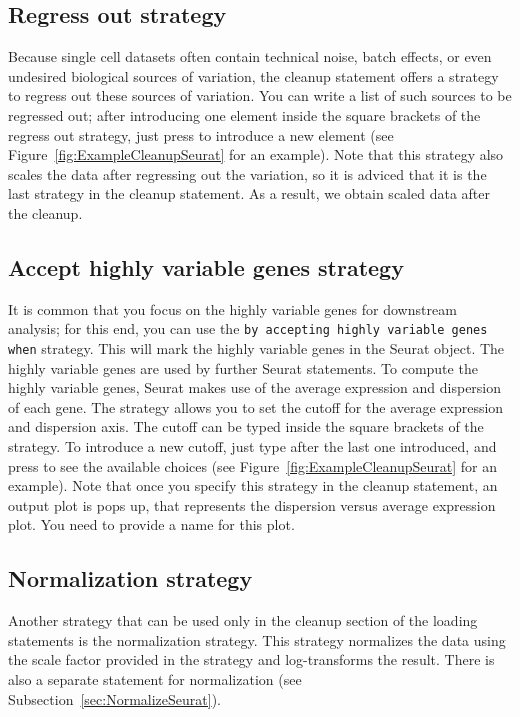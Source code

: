 \subsection{Regress out strategy}
Because single cell datasets often contain technical noise, batch effects, or even undesired
biological sources of variation, the cleanup statement offers a strategy to regress out
these sources of variation. You can write a list of such sources to be regressed out;
after introducing one element inside the square brackets of the regress out strategy, just
press \keys{\return} to introduce a new element (see Figure~\ref{fig:ExampleCleanupSeurat}
for an example). Note that this strategy also scales the data after regressing out the
variation, so it is adviced that it is the last strategy in the cleanup statement. As a result,
we obtain scaled data after the cleanup.

\subsection{Accept highly variable genes strategy}
It is common that you focus on the highly variable genes for downstream analysis; for this end,
you can use the \texttt{by accepting highly variable genes when} strategy. This will mark
the highly variable genes in the Seurat object. The highly variable genes are used by further Seurat
statements. To compute the highly variable genes, Seurat makes use of the average expression
and dispersion of each gene. The strategy allows you to set the cutoff for the average expression
and dispersion axis. The cutoff can be typed inside the square brackets of the strategy. To
introduce a new cutoff, just type \keys{\return} after the last one introduced, and press
\keys{\ctrl+\space} to see the available choices (see Figure~\ref{fig:ExampleCleanupSeurat}
for an example). Note that once you specify this strategy in the cleanup statement, an
output plot is pops up, that represents the dispersion versus average expression plot. You
need to provide a name for this plot.

\subsection{Normalization strategy}
Another strategy that can be used only in the cleanup section of the loading statements is the
normalization strategy. This strategy normalizes the data using the scale factor provided
in the strategy and log-transforms the result. There is also a separate statement for normalization (see
Subsection~\ref{sec:NormalizeSeurat}).

